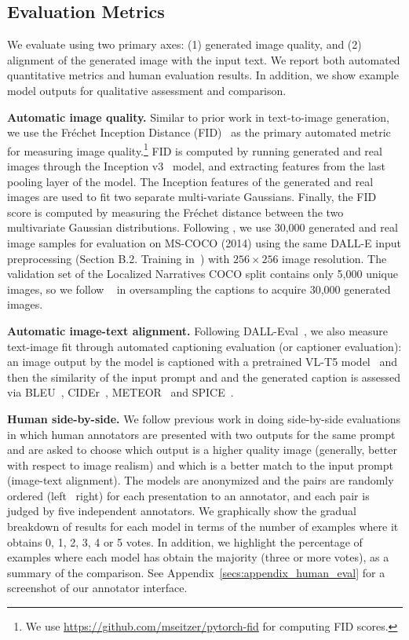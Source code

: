 \subsection{Evaluation Metrics}

We evaluate using two primary axes: (1) generated image quality, and (2) alignment of the generated image with the input text. We report both automated quantitative metrics and human evaluation results. In addition, we show example model outputs for qualitative assessment and comparison.

\textbf{Automatic image quality.} Similar to prior work in text-to-image generation, we use the Fr\'echet Inception Distance (FID)~\cite{heusel2017gans} as the primary automated metric for measuring image quality.\footnote{We use \url{https://github.com/mseitzer/pytorch-fid} for computing FID scores.} FID is computed by running generated and real images through the Inception v3~\cite{szegedy2016rethinking} model, and extracting features from the last pooling layer of the model. The Inception features of the generated and real images are used to fit two separate multi-variate Gaussians. Finally, the FID score is computed by measuring the Fr\'echet distance between the two multivariate Gaussian distributions. Following \cite{Xu18,zhang2021cross,ramesh2021zero}, we use 30,000 generated and real image samples for evaluation on MS-COCO (2014) using the same DALL-E input preprocessing (Section B.2. Training in~\cite{ramesh2021zero}) with \(256{\times}256\) image resolution. The validation set of the Localized Narratives COCO split contains only 5,000 unique images, so we follow ~\cite{zhang2021cross} in oversampling the captions to acquire 30,000 generated images.

\textbf{Automatic image-text alignment.} Following DALL-Eval~\cite{Cho2022DallEval}, we also measure text-image fit through automated captioning evaluation (or captioner evaluation): an image output by the model is captioned with a pretrained VL-T5 model~\cite{cho2021vlt5} and then the similarity of the input prompt and and the generated caption is assessed via BLEU~\cite{Papineni2002}, CIDEr~\cite{Vedantam2015}, METEOR~\cite{denkowski2014} and SPICE~\cite{spice2016}.  

\textbf{Human side-by-side.} We follow previous work \cite{zhang2021cross, ramesh2021zero} in doing side-by-side evaluations in which human annotators are presented with two outputs for the same prompt and are asked to choose which output is a higher quality image (generally, better with respect to image realism) and which is a better match to the input prompt (image-text alignment). The models are anonymized and the pairs are randomly ordered (left \vs\ right) for each presentation to an annotator, and each pair is judged by five independent annotators. We graphically show the gradual breakdown of results for each model in terms of the number of examples where it obtains 0, 1, 2, 3, 4 or 5 votes. In addition, we highlight the percentage of examples where each model has obtain the majority (three or more votes), as a summary of the comparison. See Appendix~\ref{secs:appendix_human_eval} for a screenshot of our annotator interface.

